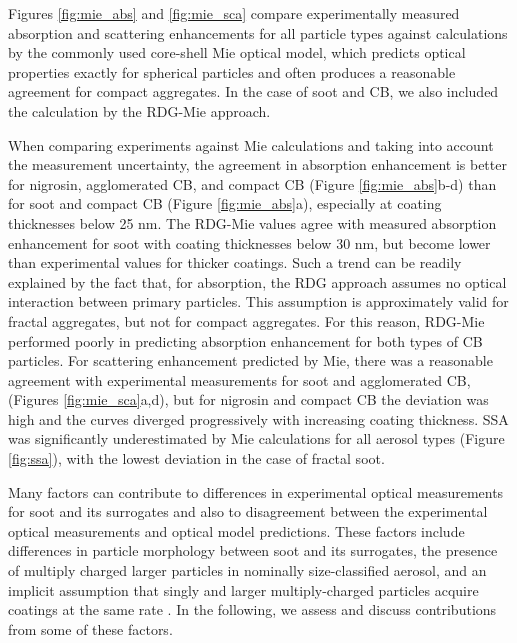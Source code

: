 Figures \ref{fig:mie_abs} and \ref{fig:mie_sca} compare experimentally measured absorption and scattering enhancements for all particle types against calculations by the commonly used core-shell Mie optical model, which predicts optical properties exactly for spherical particles and often produces a reasonable agreement for compact aggregates. In the case of soot and CB, we also included the calculation by the RDG-Mie approach.


When comparing experiments against Mie calculations and taking into account the measurement uncertainty, the agreement in absorption enhancement is better for nigrosin, agglomerated CB, and compact CB (Figure \ref{fig:mie_abs}b-d) than for soot and compact CB (Figure \ref{fig:mie_abs}a), especially at coating thicknesses below 25 nm. The RDG-Mie values agree with measured absorption enhancement for soot with coating thicknesses below 30 nm, but become lower than experimental values for thicker coatings. Such a trend can be readily explained by the fact that, for absorption, the RDG approach assumes no optical interaction between primary particles. This assumption is approximately valid for fractal aggregates, but not for compact aggregates. For this reason, RDG-Mie performed poorly in predicting absorption enhancement for both types of CB particles. For scattering enhancement predicted by Mie, there was a reasonable agreement with experimental measurements for soot and agglomerated CB, (Figures \ref{fig:mie_sca}a,d), but for nigrosin and compact CB the deviation was high and the curves diverged progressively with increasing coating thickness. SSA was significantly underestimated by Mie calculations for all aerosol types (Figure \ref{fig:ssa}), with the lowest deviation in the case of fractal soot.

Many factors can contribute to differences in experimental optical measurements for soot and its surrogates and also to disagreement between the experimental optical measurements and optical model predictions. These factors include differences in particle morphology between soot and its surrogates, the presence of multiply charged larger particles in nominally size-classified aerosol, and an implicit assumption that singly and larger multiply-charged particles acquire coatings at the same rate \citep{RN75}. In the following, we assess and discuss contributions from some of these factors.


